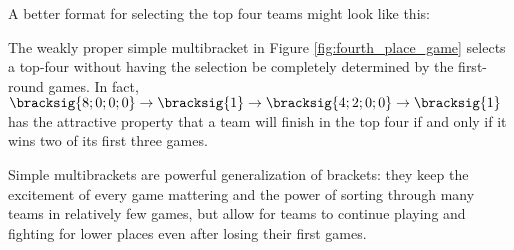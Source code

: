 {    A better format for selecting the top four teams might look like this:


    The weakly proper simple multibracket in Figure \ref{fig:fourth_place_game} selects a top-four without having the selection be completely determined by the first-round games. In fact, $\bracksig{8;0;0;0} \to \bracksig{1} \to \bracksig{4; 2; 0; 0} \to \bracksig{1}$ has the attractive property that a team will finish in the top four if and only if it wins two of its first three games.

    Simple multibrackets are powerful generalization of brackets: they keep the excitement of every game mattering and the power of sorting through many teams in relatively few games, but allow for teams to continue playing and fighting for lower places even after losing their first games.
}